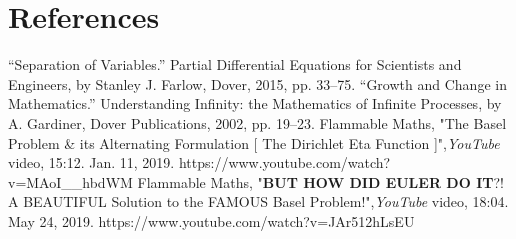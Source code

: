 \documentclass[12pt]{article}
\begin{document}
\section{References}
“Separation of Variables.” Partial Differential Equations for Scientists and Engineers, by Stanley J. Farlow, Dover, 2015, pp. 33–75.
\newline
\newline“Growth and Change in Mathematics.” Understanding Infinity: the Mathematics of Infinite Processes, by A. Gardiner, Dover Publications, 2002, pp. 19–23.
\newline
\newline
Flammable Maths, "The Basel Problem \& its Alternating Formulation [ The Dirichlet Eta Function ]",\textit{YouTube} video, 15:12. Jan. 11, 2019. \newline
https://www.youtube.com/watch?v=MAoI\_\_hbdWM
\newline
\newline
Flammable Maths, "\textbf{BUT HOW DID EULER DO IT}?! A BEAUTIFUL Solution to the FAMOUS Basel Problem!",\textit{YouTube} video, 18:04. May 24, 2019. https://www.youtube.com/watch?v=JAr512hLsEU
\end{document}
